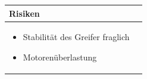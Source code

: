 \begin{table}[h]
\begin{tabular}{p{}p{}}


 \textbf{Risiken} & \\ \hline
	 
\begin{itemize}
\item Stabilität des Greifer fraglich
\item Motorenüberlastung
\end{itemize}

 
\end{tabular}
\end{table}

\pagebreak